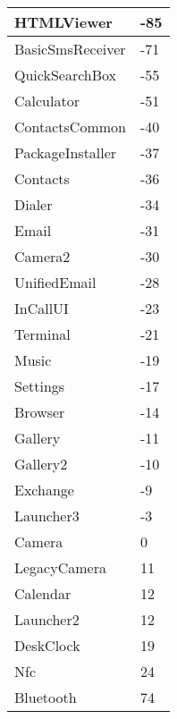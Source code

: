\begin{tabular}{|l|l|}
\hline
HTMLViewer&-85\\
\hline
BasicSmsReceiver&-71\\
\hline
QuickSearchBox&-55\\
\hline
Calculator&-51\\
\hline
ContactsCommon&-40\\
\hline
PackageInstaller&-37\\
\hline
Contacts&-36\\
\hline
Dialer&-34\\
\hline
Email&-31\\
\hline
Camera2&-30\\
\hline
UnifiedEmail&-28\\
\hline
InCallUI&-23\\
\hline
Terminal&-21\\
\hline
Music&-19\\
\hline
Settings&-17\\
\hline
Browser&-14\\
\hline
Gallery&-11\\
\hline
Gallery2&-10\\
\hline
Exchange&-9\\
\hline
Launcher3&-3\\
\hline
Camera&0\\
\hline
LegacyCamera&11\\
\hline
Calendar&12\\
\hline
Launcher2&12\\
\hline
DeskClock&19\\
\hline
Nfc&24\\
\hline
Bluetooth&74\\
\hline
\end{tabular}
